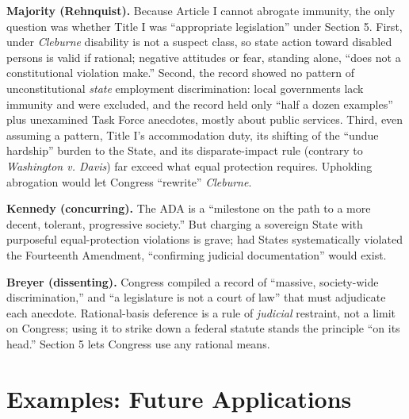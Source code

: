 \documentclass[12pt]{article}
\begin{document}
\textbf{Majority (Rehnquist).} Because Article I cannot abrogate immunity, the only question was whether Title I was ``appropriate legislation'' under Section 5. First, under \textit{Cleburne} disability is not a suspect class, so state action toward disabled persons is valid if rational; negative attitudes or fear, standing alone, ``does not a constitutional violation make.'' Second, the record showed no pattern of unconstitutional \textit{state} employment discrimination: local governments lack immunity and were excluded, and the record held only ``half a dozen examples'' plus unexamined Task Force anecdotes, mostly about public services. Third, even assuming a pattern, Title I's accommodation duty, its shifting of the ``undue hardship'' burden to the State, and its disparate-impact rule (contrary to \textit{Washington v. Davis}) far exceed what equal protection requires. Upholding abrogation would let Congress ``rewrite'' \textit{Cleburne}.

\textbf{Kennedy (concurring).} The ADA is a ``milestone on the path to a more decent, tolerant, progressive society.'' But charging a sovereign State with purposeful equal-protection violations is grave; had States systematically violated the Fourteenth Amendment, ``confirming judicial documentation'' would exist.

\textbf{Breyer (dissenting).} Congress compiled a record of ``massive, society-wide discrimination,'' and ``a legislature is not a court of law'' that must adjudicate each anecdote. Rational-basis deference is a rule of \textit{judicial} restraint, not a limit on Congress; using it to strike down a federal statute stands the principle ``on its head.'' Section 5 lets Congress use any rational means.

\section{Examples: Future Applications}
\end{document}
